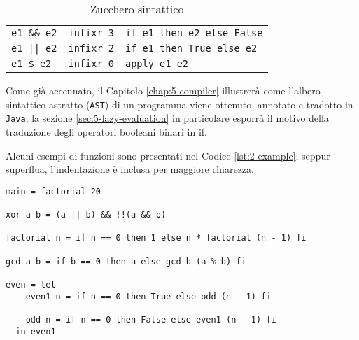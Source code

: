 \begin{table}[H]
\begin{center}
\begin{tabularx}{\textwidth}{|p{8em}@{\quad}p{7em}|X|}
            \texttt{e1 \&\& e2}          & \texttt{infixr 3} & \texttt{if e1 then e2 else False} \\
            \texttt{e1 || e2}            & \texttt{infixr 2} & \texttt{if e1 then True else e2}  \\
            \texttt{e1 \$ e2}            & \texttt{infixr 0} & \texttt{apply e1 e2}              \\
            \hline
        \end{tabularx}
    \end{center}
    \caption{Zucchero sintattico}
    \label{tab:2-sugar}
\end{table}

\newpage

\noindent Come già accennato, il Capitolo \ref{chap:5-compiler} illustrerà come l'albero sintattico astratto (\texttt{AST})
di un programma viene ottenuto, annotato e tradotto in \texttt{Java}; la sezione \ref{sec:5-lazy-evaluation}
in particolare esporrà il motivo della traduzione degli operatori booleani binari in if.

\noindent Alcuni esempi di funzioni sono presentati nel Codice \ref{lst:2-example};
seppur superflua, l'indentazione è inclusa per maggiore chiarezza.

\vspace{8mm}
\begin{lstlisting}[caption={Esempio di programma}, style=funxCode, label={lst:2-example}]
main = factorial 20

xor a b = (a || b) && !!(a && b)

factorial n = if n == 0 then 1 else n * factorial (n - 1) fi

gcd a b = if b == 0 then a else gcd b (a % b) fi

even = let
    even1 n = if n == 0 then True else odd (n - 1) fi

    odd n = if n == 0 then False else even1 (n - 1) fi
  in even1
\end{lstlisting}
